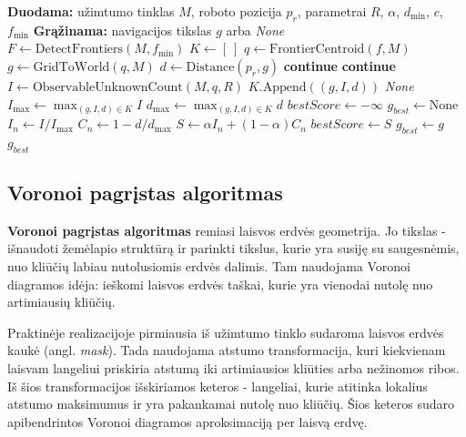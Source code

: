 \documentclass[]{VUMIFTemplateClass}
\begin{document}
\begin{algorithm}[H]
\caption{Informacijos prieaugio algoritmas}
\begin{algorithmic}[1]
\STATE \textbf{Duodama:} užimtumo tinklas $M$, roboto pozicija $p_r$, parametrai $R$, $\alpha$, $d_{\min}$, $c$, $f_{\min}$
\STATE \textbf{Grąžinama:} navigacijos tikslas $g$ arba \textit{None}
\STATE $F \leftarrow \mathrm{DetectFrontiers}(M,f_{\min})$
\STATE $K \leftarrow [\ ]$
  \STATE $q \leftarrow \mathrm{FrontierCentroid}(f,M)$
  \STATE $g \leftarrow \mathrm{GridToWorld}(q,M)$
  \STATE $d \leftarrow \mathrm{Distance}(p_r,g)$
    \STATE \textbf{continue}
  \ENDIF
    \STATE \textbf{continue}
  \ENDIF
  \STATE $I \leftarrow \mathrm{ObservableUnknownCount}(M,q,R)$
  \STATE $K.\mathrm{Append}((g,I,d))$
\ENDFOR
{}
  \RETURN \textit{None}
\ENDIF
\STATE $I_{\max} \leftarrow \max_{(g,I,d)\in K} I$
\STATE $d_{\max} \leftarrow \max_{(g,I,d)\in K} d$
\STATE $bestScore \leftarrow -\infty$
\STATE $g_{best} \leftarrow \mathrm{None}$
  \STATE $I_n \leftarrow I / I_{\max}$
  \STATE $C_n \leftarrow 1 - d / d_{\max}$
  \STATE $S \leftarrow \alpha I_n + (1-\alpha)C_n$
    \STATE $bestScore \leftarrow S$
    \STATE $g_{best} \leftarrow g$
  \ENDIF
\ENDFOR
\RETURN $g_{best}$
\end{algorithmic}
\end{algorithm}

\subsection{Voronoi pagrįstas algoritmas}

\textbf{Voronoi pagrįstas algoritmas} remiasi laisvos erdvės geometrija. Jo tikslas - išnaudoti žemėlapio struktūrą ir parinkti tikslus, kurie yra susiję su
saugesnėmis, nuo kliūčių labiau nutolusiomis erdvės dalimis. Tam naudojama Voronoi diagramos idėja: ieškomi laisvos erdvės taškai, kurie yra
vienodai nutolę nuo artimiausių kliūčių.

Praktinėje realizacijoje pirmiausia iš užimtumo tinklo sudaroma laisvos erdvės kaukė (angl. \textit{mask}). Tada naudojama atstumo transformacija, kuri kiekvienam laisvam langeliui
priskiria atstumą iki artimiausios kliūties arba nežinomos ribos. Iš šios transformacijos išskiriamos keteros - langeliai, kurie atitinka lokalius atstumo
maksimumus ir yra pakankamai nutolę nuo kliūčių. Šios keteros sudaro apibendrintos Voronoi diagramos aproksimaciją per laisvą erdvę.
\end{document}
